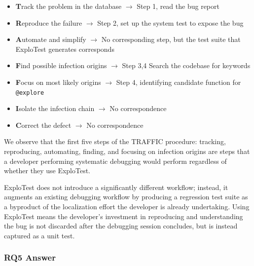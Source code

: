 \begin{itemize}
    \item \textbf{T}rack the problem in the database $\rightarrow$ Step 1, read the bug report
    \item \textbf{R}eproduce the failure $\rightarrow$ Step 2, set up the system test to expose the bug
    \item \textbf{A}utomate and simplify $\rightarrow$ No corresponding step, but the test suite that ExploTest generates corresponds
    \item \textbf{F}ind possible infection origins $\rightarrow$ Step 3,4 Search the codebase for keywords
    \item \textbf{F}ocus on most likely origins $\rightarrow$ Step 4, identifying candidate function for \verb|@explore|
    \item \textbf{I}solate the infection chain $\rightarrow$ No correspondence
    \item \textbf{C}orrect the defect $\rightarrow$ No correspondence
\end{itemize}

We observe that the first five steps of the
TRAFFIC procedure: tracking, reproducing, automating, finding, and focusing
on infection origins are steps that a developer performing
systematic debugging would perform regardless of whether they
use ExploTest.

ExploTest does not introduce a significantly different workflow;
instead, it augments an existing debugging
workflow by producing a regression test suite as a byproduct
of the localization effort the developer is already undertaking.
Using ExploTest means the developer's investment in reproducing and understanding the
bug is not discarded after the debugging session concludes,
but is instead captured as a unit test.


\subsubsection{RQ5 Answer}
\noindent{}